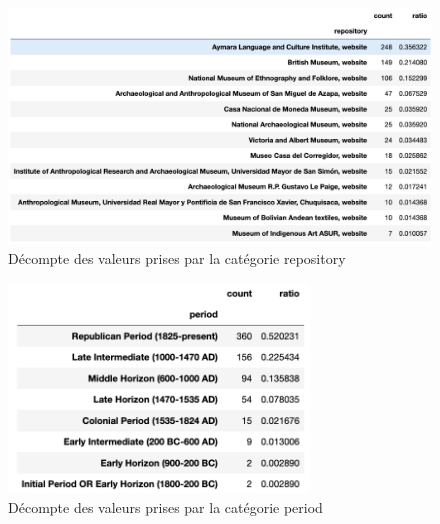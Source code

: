 \begin{figure}[!h]
            \begin{center}
                \includegraphics[width=12cm]{../images/count_repository.png}
            \end{center}
    \caption{Décompte des valeurs prises par la catégorie \og repository\fg}     
\end{figure}

\begin{figure}[!h]
        \begin{center}
        		\includegraphics[width=8cm]{../images/count_period}
	\end{center}
    \caption{Décompte des valeurs prises par la catégorie \og period\fg}     
    \label{fig:period}
\end{figure}


